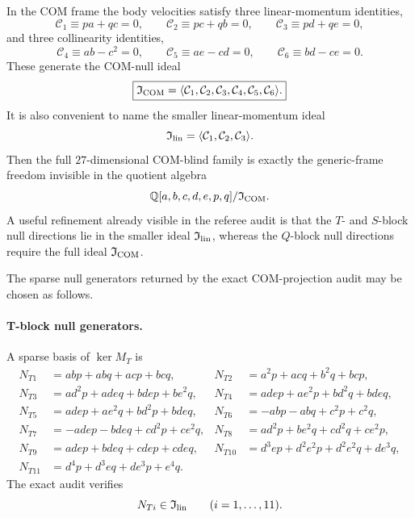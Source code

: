 \documentclass[11pt]{article}
\begin{document}
In the COM frame the body velocities satisfy three linear-momentum identities,
\begin{equation}
\boxed{
\mathcal C_1\equiv pa+qc=0,
\qquad
\mathcal C_2\equiv pc+qb=0,
\qquad
\mathcal C_3\equiv pd+qe=0,}
\label{eq:app-com-null-C123}
\end{equation}
and three collinearity identities,
\begin{equation}
\boxed{
\mathcal C_4\equiv ab-c^2=0,
\qquad
\mathcal C_5\equiv ae-cd=0,
\qquad
\mathcal C_6\equiv bd-ce=0.}
\label{eq:app-com-null-C456}
\end{equation}
These generate the COM-null ideal
\begin{equation}
\boxed{
\mathfrak I_{\rm COM}
=
\langle \mathcal C_1,\mathcal C_2,\mathcal C_3,\mathcal C_4,\mathcal C_5,\mathcal C_6\rangle.}
\label{eq:app-com-null-ideal-def}
\end{equation}
It is also convenient to name the smaller linear-momentum ideal
\begin{equation}
\mathfrak I_{\rm lin}
=
\langle \mathcal C_1,\mathcal C_2,\mathcal C_3\rangle.
\label{eq:app-com-null-linear-ideal}
\end{equation}
Then the full $27$-dimensional COM-blind family is exactly the generic-frame
freedom invisible in the quotient algebra
\begin{equation}
\mathbb Q[a,b,c,d,e,p,q]/\mathfrak I_{\rm COM}.
\label{eq:app-com-null-quotient-algebra}
\end{equation}
A useful refinement already visible in the referee audit is that the $T$- and
$S$-block null directions lie in the smaller ideal $\mathfrak I_{\rm lin}$,
whereas the $Q$-block null directions require the full ideal
$\mathfrak I_{\rm COM}$.

The sparse null generators returned by the exact COM-projection audit may be
chosen as follows.

\paragraph{T-block null generators.}
A sparse basis of $\ker M_T$ is
{\small
\begin{align*}
N_{T1}&=abp+abq+acp+bcq,
&
N_{T2}&=a^2p+acq+b^2q+bcp,
\\
N_{T3}&=ad^2p+adeq+bdep+be^2q,
&
N_{T4}&=adep+ae^2p+bd^2q+bdeq,
\\
N_{T5}&=adep+ae^2q+bd^2p+bdeq,
&
N_{T6}&=-abp-abq+c^2p+c^2q,
\\
N_{T7}&=-adep-bdeq+cd^2p+ce^2q,
&
N_{T8}&=ad^2p+be^2q+cd^2q+ce^2p,
\\
N_{T9}&=adep+bdeq+cdep+cdeq,
&
N_{T10}&=d^3ep+d^2e^2p+d^2e^2q+de^3q,
\\
N_{T11}&=d^4p+d^3eq+de^3p+e^4q.
\end{align*}}
The exact audit verifies
\begin{equation}
N_{Ti}\in\mathfrak I_{\rm lin}
\qquad (i=1,\dots,11).
\label{eq:app-com-null-T-membership}
\end{equation}
\end{document}

